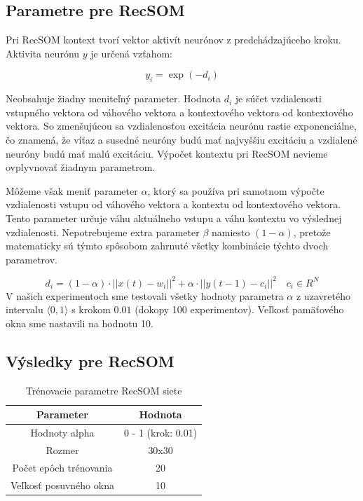 \subsection{Parametre pre RecSOM}
Pri RecSOM kontext tvorí vektor aktivít neurónov z predchádzajúceho kroku.
Aktivita neurónu $y$ je určená vzťahom:

\begin{equation}
    y_{i} = \exp{(-d_{i})}
\end{equation}

Neobsahuje žiadny meniteľný parameter. Hodnota $d_{i}$ je súčet vzdialenosti vstupného vektora od váhového vektora a kontextového vektora od 
kontextového vektora. So zmenšujúcou sa vzdialenosťou excitácia neurónu rastie exponenciálne, čo 
znamená, že víťaz a susedné neuróny budú mať najvyššiu excitáciu a vzdialené neuróny budú mať malú excitáciu.
Výpočet kontextu pri RecSOM nevieme ovplyvnovať žiadnym parametrom.

Môžeme však meniť parameter $\alpha$, ktorý sa používa pri samotnom výpočte vzdialenosti
vstupu od váhového vektora a kontextu od kontextového vektora. Tento parameter určuje váhu aktuálneho vstupu a váhu kontextu
vo výslednej vzdialenosti.
Nepotrebujeme extra parameter $\beta$ namiesto $(1 - \alpha)$, pretože matematicky sú týmto spôsobom zahrnuté všetky kombinácie
týchto dvoch parametrov.

\begin{equation}
	d_i = (1 - \alpha) \cdot ||x(t) - w_i||^{2} + \alpha \cdot ||y(t-1) - c_i||^{2} \quad c_{i} \in R^{N}
\end{equation}
V našich experimentoch sme testovali všetky hodnoty parametra $\alpha$ z uzavretého intervalu
$\langle0, 1\rangle$ s krokom $0.01$ (dokopy 100 experimentov).
Veľkosť pamäťového okna sme nastavili na hodnotu 10.

\subsection{Výsledky pre RecSOM}

\begin{table}[h!]
    \centering
    \begin{tabular}{|c|c|} 
     \hline
     Parameter & Hodnota \\ 
     \hline\hline
     Hodnoty alpha & 0 - 1  (krok: 0.01) \\ 
     \hline
     Rozmer  & 30x30  \\
     \hline
     Počet epôch trénovania & 20 \\
     \hline
     Veľkosť posuvného okna & 10  \\
     \hline
    \end{tabular}
    \caption{Trénovacie parametre RecSOM siete}
    \label{table:1}
    \end{table}


